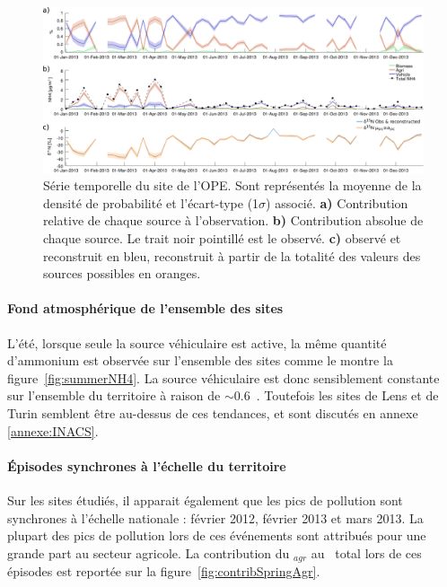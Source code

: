 \begin{figure}[ht]
    \centering
    \includegraphics[width=1.0\linewidth]{figures/INACS/MCA_OPE_S3-BioFerVeh_e-30_timeSerie2013.pdf}
    \caption{Série temporelle du site de l'OPE. Sont représentés la moyenne de la densité
        de probabilité et l'écart-type (1$\sigma$) associé. \textbf{a)} Contribution
        relative de chaque source à l'observation. \textbf{b)} Contribution absolue de
        chaque source. Le trait noir pointillé est le \NHq{} observé. \textbf{c)}
        \dN{} observé et reconstruit en bleu, \dN{} reconstruit à partir de la totalité des
        valeurs des sources possibles en oranges.
    }
    \label{fig:timeSerieOPE}
\end{figure}

\paragraph{Fond atmosphérique de l'ensemble des sites}
L'été, lorsque seule la source véhiculaire est active, la même quantité d'ammonium est
observée sur l'ensemble des sites comme le montre la figure~\ref{fig:summerNH4}.
La source véhiculaire est donc sensiblement constante sur l'ensemble du territoire à
raison de $\sim0.6$~\si{\ugm}.
Toutefois les sites de Lens et de Turin semblent être au-dessus de ces tendances, et sont
discutés en annexe \ref{annexe:INACS}.

\paragraph{Épisodes synchrones à l'échelle du territoire}
Sur les sites étudiés, il apparait également que les pics de pollution sont synchrones à
l'échelle nationale : février 2012, février 2013 et mars 2013.
La plupart des pics de pollution lors de ces événements sont attribués pour une grande
part au secteur agricole.
La contribution du \NHq$_{agr}$ au \NHq~total lors de ces épisodes est reportée sur la
figure~\ref{fig:contribSpringAgr}.

